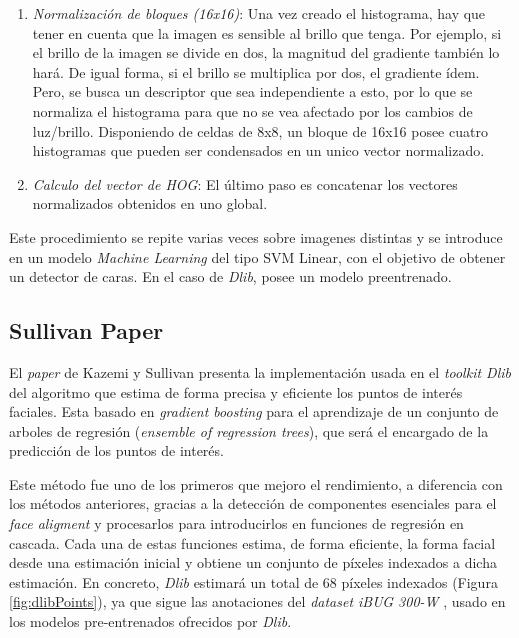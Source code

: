 \begin{enumerate}
	\item \textit{Normalización de bloques (16x16)}: Una vez creado el histograma, hay que tener en cuenta que la imagen es sensible al brillo que tenga. Por ejemplo, si el brillo de la imagen se divide en dos, la magnitud del gradiente también lo hará. De igual forma, si el brillo se multiplica por dos, el gradiente ídem. Pero, se busca un descriptor que sea independiente a esto, por lo que se normaliza el histograma para que no se vea afectado por los cambios de luz/brillo.	Disponiendo de celdas de 8x8, un bloque de 16x16 posee cuatro histogramas que pueden ser condensados en un unico vector normalizado.
	
	\item \textit{Calculo del vector de HOG}: El último paso es concatenar los vectores normalizados obtenidos en uno global.

\end{enumerate}

Este procedimiento se repite varias veces sobre imagenes distintas y se introduce en un modelo \textit{Machine Learning} del tipo SVM Linear, con el objetivo de obtener un detector de caras. En el caso de \textit{Dlib}, posee un modelo preentrenado.


\subsection*{Sullivan Paper}

El \textit{paper} de Kazemi y Sullivan presenta la implementación usada en el \textit{toolkit Dlib} del algoritmo que estima de forma precisa y eficiente los puntos de interés faciales. Esta basado en \textit{gradient boosting} para el aprendizaje de un conjunto de arboles de regresión (\textit{ensemble of regression trees}), que será el encargado de la predicción de los puntos de interés.\cite{faceLandmark} 

Este método fue uno de los primeros que mejoro el rendimiento, a diferencia con los métodos anteriores, gracias a la detección de componentes esenciales para el \textit{face aligment} y procesarlos para introducirlos en funciones de regresión en cascada. Cada una de estas funciones estima, de forma eficiente, la forma facial desde una estimación inicial y obtiene un conjunto de píxeles indexados a dicha estimación. En concreto, \textit{Dlib} estimará un total de 68 píxeles indexados (Figura \ref{fig:dlibPoints}), ya que sigue las anotaciones del \textit{dataset iBUG 300-W} \cite{ibug}, usado en los modelos pre-entrenados ofrecidos por \textit{Dlib}.

